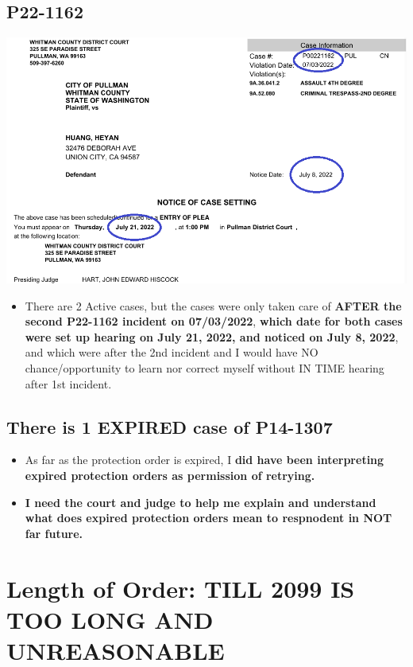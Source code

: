 \documentclass[9pt, b5paper]{article}
\begin{document}
\subsection{\textbf{P22-1162}}
\label{sec-2-2}

\includegraphics[width=.9\linewidth]{./pic/dearCousin_20220919_185057.png}
\begin{itemize}
\item There are 2 Active cases, but the cases were only taken care of \textbf{AFTER the second P22-1162 incident on 07/03/2022}, \textbf{which date for both cases were set up hearing on July 21, 2022, and noticed on July 8, 2022}, and which were after the 2nd incident and I would have NO chance/opportunity to learn nor correct myself without IN TIME hearing after 1st incident.
\end{itemize}
\subsection{There is 1 EXPIRED case of \textbf{P14-1307}}
\label{sec-2-3}
\begin{itemize}
\item As far as the protection order is expired, I \textbf{did have been interpreting expired protection orders as permission of retrying.}
\item \textbf{I need the court and judge to help me explain and understand what does expired protection orders mean to respnodent in NOT far future.}
\end{itemize}

\section{Length of Order: TILL 2099 IS TOO LONG AND UNREASONABLE}
\label{sec-3}
\end{document}
